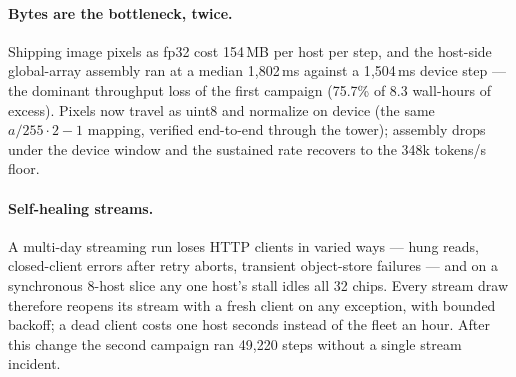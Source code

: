 \paragraph{Bytes are the bottleneck, twice.} Shipping image pixels as
fp32 cost 154\,MB per host per step, and the host-side global-array
assembly ran at a median 1{,}802\,ms against a 1{,}504\,ms device step
--- the dominant throughput loss of the first campaign (75.7\% of 8.3
wall-hours of excess). Pixels now travel as uint8 and normalize on
device (the same \(a/255\cdot2-1\) mapping, verified end-to-end
through the tower); assembly drops under the device window and the
sustained rate recovers to the 348k tokens/s floor.

\paragraph{Self-healing streams.} A multi-day streaming run loses HTTP
clients in varied ways --- hung reads, closed-client errors after retry
aborts, transient object-store failures --- and on a synchronous
8-host slice any one host's stall idles all 32 chips. Every stream
draw therefore reopens its stream with a fresh client on any
exception, with bounded backoff; a dead client costs one host seconds
instead of the fleet an hour. After this change the second campaign
ran 49{,}220 steps without a single stream incident.
